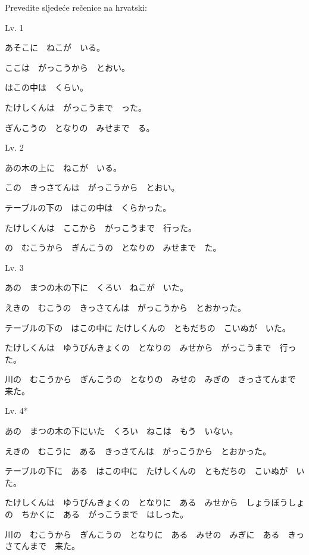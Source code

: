 
	Prevedite sljedeće rečenice na hrvatski:
	
	\begin{mondai}{Lv. 1}
		\item あそこに　ねこが　いる。
		\item ここは　がっこうから　とおい。
		\item はこの中は　くらい。
		\item たけしくんは　がっこうまで　った。
		\item ぎんこうの　となりの　みせまで　る。
	\end{mondai}

	\begin{mondai}{Lv. 2}
		\item あの木の上に　ねこが　いる。
		\item この　きっさてんは　がっこうから　とおい。
		\item テーブルの下の　はこの中は　くらかった。
		\item たけしくんは　ここから　がっこうまで　行った。
		\item {}の　むこうから　ぎんこうの　となりの　みせまで　た。
	\end{mondai}

	\begin{mondai}{Lv. 3\footnotemark[1]}
		\item あの　まつの木の下に　くろい　ねこが　いた。
		\item えきの　むこうの　きっさてんは　がっこうから　とおかった。
		\item テーブルの下の　はこの中に たけしくんの　ともだちの　こいぬが　いた。
		\item たけしくんは　ゆうびんきょくの　となりの　みせから　がっこうまで　行った。
		\item 川の　むこうから　ぎんこうの　となりの　みせの　みぎの　きっさてんまで　来た。
	\end{mondai}
	
	\begin{mondai}{Lv. 4*}
		\item あの　まつの木の下にいた　くろい　ねこは　もう　いない。
		\item えきの　むこうに　ある　きっさてんは　がっこうから　とおかった。
		\item テーブルの下に　ある　はこの中に　たけしくんの　ともだちの　こいぬが　いた。
		\item たけしくんは　ゆうびんきょくの　となりに　ある　みせから　しょうぼうしょの　ちかくに　ある　がっこうまで　はしった。
		\item 川の　むこうから　ぎんこうの　となりに　ある　みせの　みぎに　ある　きっさてんまで　来た。
	\end{mondai}


